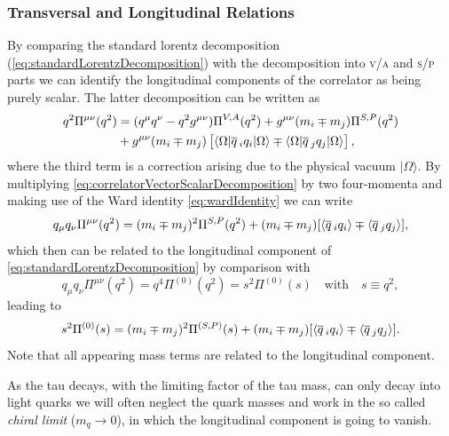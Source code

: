 \documentclass[../../index.tex]{subfiles}
\begin{document}
\subsubsection{Transversal and Longitudinal Relations}
By comparing the standard lorentz decomposition
(\cref{eq:standardLorentzDecomposition}) with the decomposition into
\textsc{v}/\textsc{a} and \textsc{s}/\textsc{p} parts we can identify the
longitudinal components of the correlator as being purely scalar. The latter
decomposition can be written as \cite{Broadhurst1981,Jamin1992}
\begin{equation}
  \label{eq:correlatorVectorScalarDecomposition}
  \begin{split}
    q^2\Pi^{\mu\nu}(q^2) &= (q^\mu q^\nu - q^2 g^{\mu\nu}) \Pi^{V,A}(q^2) + g^{\mu\nu} (m_i \mp m_j)\Pi^{S,P}(q^2) \\
    &+ g^{\mu\nu}(m_i \mp m_j) \left[ \langle\Omega\vert \overline{q}\,_i q_i
    \vert\Omega\rangle \mp \langle\Omega\vert \overline{q}\,_j q_j
    \vert\Omega\rangle\right],
  \end{split}
\end{equation}
where the third term is a correction arising due to the physical vacuum
\(|\Omega\rangle\). By multiplying \cref{eq:correlatorVectorScalarDecomposition}
by two four-momenta and making use of the Ward identity \cref{eq:wardIdentity}
we can write
\begin{equation}
  q_\mu q_\nu \Pi^{\mu\nu}(q^2) = (m_i \mp m_j)^2 \Pi^{S,P}(q^2) + (m_i \mp m_j)[\langle \overline{q}\,_i q_i \rangle \mp \langle \overline{q}\,_j q_j \rangle],
\end{equation}
which then can be related to the longitudinal component of
\cref{eq:standardLorentzDecomposition} by comparison with
\begin{equation}
  q_\mu q_\nu \Pi^{\mu\nu}(q^2) = q^4 \Pi^{(0)}(q^2) = s^2 \Pi^{(0)}(s) \quad \text{with} \quad s\equiv q^2,
\end{equation}
leading to
\begin{equation}
  \label{eq:longitudinalTwoPointFunction}
  s^2 \Pi^{(0)}(s) = (m_i \mp m_j)^2 \Pi^{(S,P)}(s) + (m_i \mp m_j)[ \langle \overline{q}\,_i q_i \rangle \mp \langle \overline{q}\,_j q_j \rangle].
\end{equation}
Note that all appearing mass terms are related to the longitudinal component.

As the tau decays, with the limiting factor of the tau mass, can only decay into
light quarks we will often neglect the quark masses and work in the so called
\textit{chiral limit} (\(m_q \to 0\)), in which the longitudinal component is
going to vanish.
\end{document}
